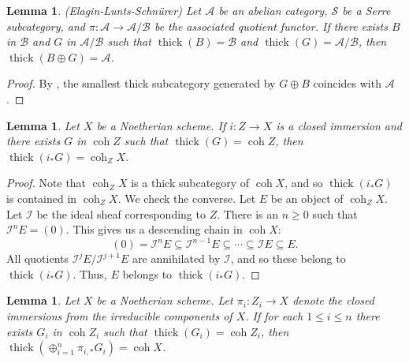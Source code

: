 \documentclass[11pt]{amsart}
\theoremstyle{plain}
\newtheorem{lemma}[theorem]{Lemma}
\theoremstyle{definition}
\numberwithin{equation}{section}
\numberwithin{theorem}{section}
\begin{document}
\begin{lemma}\label{lem:serre_localization_sequence_generation}(Elagin-Lunts-Schn\"{u}rer)
    Let $\mathcal{A}$ be an abelian category, $\mathcal{S}$ be a Serre subcategory, and $\pi\colon \mathcal{A} \to \mathcal{A}/\mathcal{B}$ be the associated quotient functor. If there exists $B$ in $\mathcal{B}$ and $G$ in $ \mathcal{A}/\mathcal{B}$ such that $\operatorname{thick}(B)=\mathcal{B}$ and $\operatorname{thick}(G)=\mathcal{A}/\mathcal{B}$, then $\operatorname{thick}(B \oplus G) = \mathcal{A}$.
\end{lemma}

\begin{proof}
    By , the smallest thick subcategory generated by $G\oplus B$ coincides with $\mathcal{A}$.
\end{proof}

\begin{lemma}\label{lem:generation_coherent_subcategory_closed_subscheme_support}
    Let $X$ be a Noetherian scheme. If $i\colon Z \to X$ is a closed immersion and there exists $G$ in $\operatorname{coh}Z$ such that $\operatorname{thick}(G)=\operatorname{coh}Z$, then $\operatorname{thick}(i_\ast G)=\operatorname{coh}_Z X$.
\end{lemma}

\begin{proof}
    Note that $\operatorname{coh}_Z X$ is a thick subcategory of $\operatorname{coh}X$, and so $\operatorname{thick}(i_\ast G)$ is contained in $\operatorname{coh}_Z X$. We check the converse. Let $E$ be an object of $\operatorname{coh}_Z X$. Let $\mathcal{I}$ be the ideal sheaf corresponding to $Z$. There is an $n\geq 0$ such that $\mathcal{I}^n E=(0)$. This gives us a descending chain in $\operatorname{coh} X$:
    \begin{displaymath}
        (0)=\mathcal{I}^n E \subseteq \mathcal{I}^{n-1}E \subseteq \cdots \subseteq \mathcal{I}E \subseteq E.
    \end{displaymath}
    All quotients $\mathcal{I}^j E/\mathcal{I}^{j+1}E$ are annihilated by $\mathcal{I}$, and so these belong to $\operatorname{thick}(i_\ast G)$. Thus, $E$ belongs to $\operatorname{thick}(i_\ast G)$.
\end{proof}

\begin{lemma}\label{lem:reduce_to_integral}
    Let $X$ be a Noetherian scheme. Let $\pi_i \colon Z_i \to X$ denote the closed immersions from the irreducible components of $X$. If for each $1\leq i \leq n$ there exists $G_i$ in $\operatorname{coh}Z_i$ such that $\operatorname{thick}(G_i)=\operatorname{coh}Z_i$, then $\operatorname{thick}(\oplus^n_{i=1} \pi_{i,\ast} G_i)= \operatorname{coh}X$.
\end{lemma}
\end{document}
